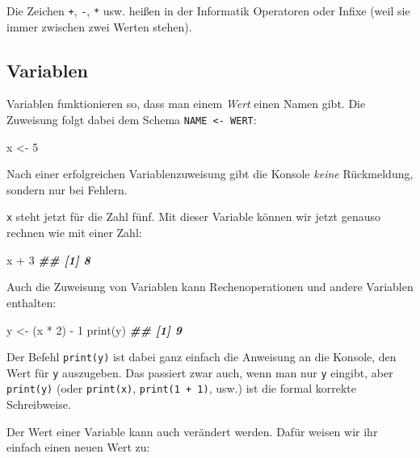 \documentclass[11pt,german,a4paper]{article}
\newenvironment{Shaded}{\begin{snugshade}}{\end{snugshade}}
\newcommand{\DecValTok}[1]{\textcolor[rgb]{0.00,0.00,0.81}{#1}}
\newcommand{\DocumentationTok}[1]{\textcolor[rgb]{0.56,0.35,0.01}{\textbf{\textit{#1}}}}
\newcommand{\FunctionTok}[1]{\textcolor[rgb]{0.00,0.00,0.00}{#1}}
\newcommand{\NormalTok}[1]{#1}
\newcommand{\OtherTok}[1]{\textcolor[rgb]{0.56,0.35,0.01}{#1}}
\newcommand{\SpecialCharTok}[1]{\textcolor[rgb]{0.00,0.00,0.00}{#1}}
\begin{document}
Die Zeichen \texttt{+}, \texttt{-}, \texttt{*} usw. heißen in der Informatik Operatoren oder Infixe (weil sie immer zwischen zwei Werten stehen).

\hypertarget{variablen}{%
\subsection{Variablen}\label{variablen}}

Variablen funktionieren so, dass man einem \emph{Wert} einen Namen gibt. Die Zuweisung folgt dabei dem Schema \texttt{NAME\ \textless{}-\ WERT}:

\begin{Shaded}
\begin{Highlighting}[]
\NormalTok{x }\OtherTok{\textless{}{-}} \DecValTok{5}
\end{Highlighting}
\end{Shaded}

Nach einer erfolgreichen Variablenzuweisung gibt die Konsole \emph{keine} Rückmeldung, sondern nur bei Fehlern.

\texttt{x} steht jetzt für die Zahl fünf. Mit dieser Variable können wir jetzt genauso rechnen wie mit einer Zahl:

\begin{Shaded}
\begin{Highlighting}[]
\NormalTok{x }\SpecialCharTok{+} \DecValTok{3}
\DocumentationTok{\#\# [1] 8}
\end{Highlighting}
\end{Shaded}

Auch die Zuweisung von Variablen kann Rechenoperationen und andere Variablen enthalten:

\begin{Shaded}
\begin{Highlighting}[]
\NormalTok{y }\OtherTok{\textless{}{-}}\NormalTok{ (x }\SpecialCharTok{*} \DecValTok{2}\NormalTok{) }\SpecialCharTok{{-}} \DecValTok{1}
\FunctionTok{print}\NormalTok{(y)}
\DocumentationTok{\#\# [1] 9}
\end{Highlighting}
\end{Shaded}

Der Befehl \texttt{print(y)} ist dabei ganz einfach die Anweisung an die Konsole, den Wert für \texttt{y} auszugeben. Das passiert zwar auch, wenn man nur \texttt{y} eingibt, aber \texttt{print(y)} (oder \texttt{print(x)}, \texttt{print(1\ +\ 1)}, usw.) ist die formal korrekte Schreibweise.

Der Wert einer Variable kann auch verändert werden. Dafür weisen wir ihr einfach einen neuen Wert zu:
\end{document}
